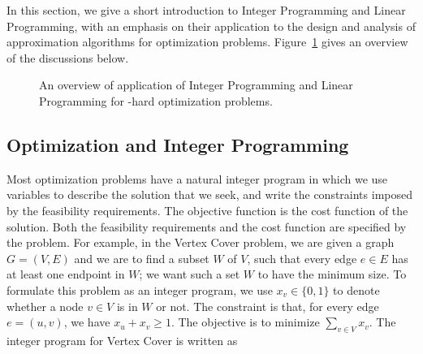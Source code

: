 \documentclass[oneside,final]{ucr}
\def\dsp{\def\baselinestretch{2.0}\large\normalsize}
\def\ssp{\def\baselinestretch{1.0}\large\normalsize}
\begin{document}
In this section, we give a short introduction to Integer
Programming and Linear Programming, with an emphasis on
their application to the design and analysis of
approximation algorithms for optimization
problems. Figure~\ref{fig:npo_ilp} gives an overview of the
discussions below.  \ssp
\begin{figure}[ht]
  \centering
  \caption{An overview of application of Integer Programming and Linear Programming for \NP-hard optimization problems.}
  \label{fig:npo_ilp}
\end{figure}
\dsp

\subsection{Optimization and Integer Programming}
\label{subsec: Optimization_IP}
Most optimization problems have a natural integer program in
which we use variables to describe the solution that we
seek, and write the constraints imposed by the feasibility
requirements. The objective function is the cost function of
the solution. Both the feasibility requirements and the cost
function are specified by the problem. For example, in the
Vertex Cover problem, we are given a graph $G=(V,E)$ and we
are to find a subset $W$ of $V$, such that every edge $e\in
E$ has at least one endpoint in $W$; we want such a set $W$
to have the minimum size. To formulate this problem as an
integer program, we use $x_v \in \{0,1\}$ to denote whether
a node $v\in V$ is in $W$ or not. The constraint is that,
for every edge $e=(u,v)$, we have $x_u + x_v \geq 1$. The
objective is to minimize $\sum_{v\in V} x_v$. The integer
program for Vertex Cover is written as
\end{document}
